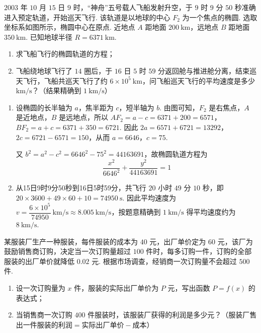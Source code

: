\begin{problem}
\(2003\) 年 \(10\) 月 \(15\) 日 \(9\) 时，“神舟”五号载人飞船发射升空，于 \(9\) 时 \(9\) 分 \(50\) 秒准确进入预定轨道，开始巡天飞行. 该轨道是以地球的中心 \(F_{2}\) 为一个焦点的椭圆. 选取坐标系如图所示，椭圆中心在原点. 近地点 \(A\) 距地面 \(200\mathrm{~km}\)，远地点 \(B\) 距地面 \(350\mathrm{~km}\). 已知地球半径 \(R=6371\mathrm{~km}\).

\begin{enumerate}
\item 求飞船飞行的椭圆轨道的方程；
\item 飞船绕地球飞行了 \(14\) 圈后，于 \(16\) 日 \(5\) 时 \(59\) 分返回舱与推进舱分离，结束巡天飞行，飞船共巡天飞行了约 \(6\times10^{5}\mathrm{~km}\)，问飞船巡天飞行的平均速度是多少 \(\mathrm{km/s}\)？（结果精确到 \(1\mathrm{~km/s}\)）
\end{enumerate}

\FloatBarrier
\end{problem}

\begin{solution}
\begin{enumerate}
\item 设椭圆的长半轴为 \(a\)，焦半距为 \(c\)，短半轴为 \(b\). 由图可知，\(F_{2}\) 是右焦点，\(A\) 是近地点，\(B\) 是远地点，所以 \(AF_{2}=a-c=6371+200=6571\)，\(BF_{2}=a+c=6371+350=6721\). 因此 \(2a=6571+6721=13292\)，\(2c=6721-6571=150\)，从而 \(a=6646\)，\(c=75\).

又 \(b^{2}=a^{2}-c^{2}=6646^{2}-75^{2}=44163691\)，故椭圆轨道方程为
\[
\dfrac{x^{2}}{6646^{2}}+\dfrac{y^{2}}{44163691}=1
\]

\item 从15日9时9分50秒到16日5时59分，共飞行 \(20\) 小时 \(49\) 分 \(10\) 秒，即 \(20\times3600+49\times60+10=74950\mathrm{~s}\). 因此平均速度为 \(v=\dfrac{6\times10^{5}}{74950}\mathrm{~km/s}\approx8.005\mathrm{~km/s}\)，按题意精确到 \(1\mathrm{~km/s}\) 得平均速度约为 \(8\mathrm{~km/s}\).
\end{enumerate}
\end{solution}

\begin{problem}
某服装厂生产一种服装，每件服装的成本为 \(40\) 元，出厂单价定为 \(60\) 元，该厂为鼓励销售商订购，决定当一次订购量超过 \(100\) 件时，每多订购一件，订购的全部服装的出厂单价就降低 \(0.02\) 元. 根据市场调查，经销商一次订购量不会超过 \(500\) 件.

\begin{enumerate}
\item 设一次订购量为 \(x\) 件，服装的实际出厂单价为 \(P\) 元，写出函数 \(P=f(x)\) 的表达式；
\item 当销售商一次订购 \(400\) 件服装时，该服装厂获得的利润是多少元？（服装厂售出一件服装的\(\text{利润} = \text{实际出厂单价} - \text{成本}\)）
\end{enumerate}
\end{problem}

